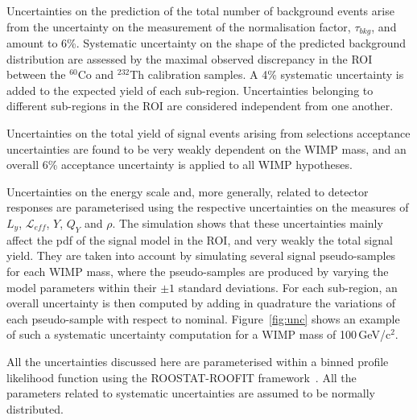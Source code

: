 Uncertainties on the  prediction of the total number of background events arise from the uncertainty on the measurement of the normalisation 
factor, $\tau_{bkg}$, and amount to 6\%. %
Systematic uncertainty on the shape of the predicted background distribution are assessed by the maximal observed discrepancy in the ROI between
the $^{60}$Co and $^{232}$Th calibration samples.  
 A 4\% systematic uncertainty is added  to the expected yield of each sub-region.
Uncertainties belonging to different sub-regions in the ROI are considered independent from one another.

Uncertainties on the total yield of signal events arising from selections acceptance uncertainties are found to be very weakly dependent on 
the WIMP mass, and an overall 6\% acceptance uncertainty is applied to all WIMP hypotheses. 

Uncertainties on the energy scale and, more generally, related to detector responses  are parameterised 
using the respective uncertainties on the measures of $L_y$, $\mathcal{L}_{eff}$, $Y$, $Q_Y$ and $\rho$. The simulation shows 
that these uncertainties mainly affect the pdf of the signal model in the ROI, and very weakly the total signal yield. 
They are taken into account by simulating several signal pseudo-samples for each WIMP mass, where the pseudo-samples are produced 
by varying the model parameters within their $\pm 1$ standard deviations. 
For each sub-region, an overall uncertainty is then computed by adding in quadrature the variations of each pseudo-sample 
with respect to nominal. Figure~\ref{fig:unc} shows an example of such a systematic uncertainty computation for a WIMP mass of 100\,GeV/c$^2$.


All the uncertainties discussed here are parameterised within a binned profile likelihood function using the ROOSTAT-ROOFIT framework~\cite{roostat,roofit}.
All the parameters related to systematic uncertainties are assumed to be normally distributed.


















